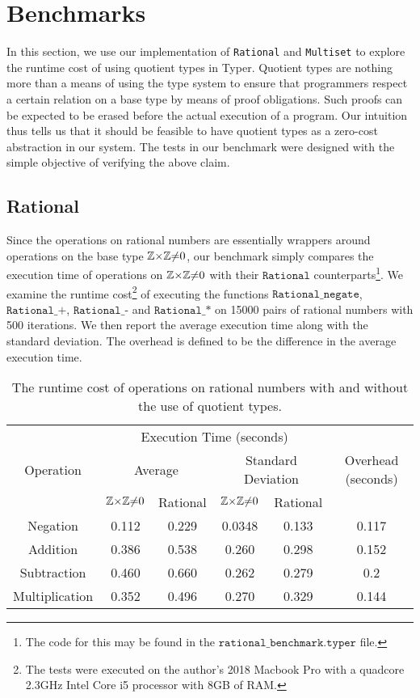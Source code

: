 \documentclass[12pt,twoside,maitrise]{dms}
\theoremstyle{definition}
\numberwithin{equation}{section}
\numberwithin{table}{chapter}
\numberwithin{figure}{chapter}
\newcommand\id[1] {\texttt{#1}}
\newcommand\fn[1] {\texttt{#1}}
\begin{document}
\section*{Benchmarks}\label{sec:quot-benchmark}

In this section, we use our implementation of \id{Rational} and \id{Multiset} to
explore the runtime cost of using quotient types in Typer. Quotient types are
nothing more than a means of using the type system to ensure that programmers
respect a certain relation on a base type by means of proof obligations. Such
proofs can be expected to be erased before the actual execution of a program.
Our intuition thus tells us that it should be feasible to have quotient types as
a zero-cost abstraction in our system. The tests in our benchmark were designed
with the simple objective of verifying the above claim.

\subsection*{Rational}

Since the operations on rational numbers are essentially wrappers around
operations on the base type $\mathbb{Z}{\times}\mathbb{Z}{\ne}0$, our benchmark simply compares the
execution time of operations on $\mathbb{Z}{\times}\mathbb{Z}{\ne}0$ with their $\fn{Rational}$
counterparts\footnote{The code for this may be found in the
$\fn{rational\_benchmark.typer}$ file.}. We examine the runtime
cost\footnote{The tests were executed on the author's 2018 Macbook Pro with a
quadcore 2.3GHz Intel Core i5 processor with 8GB of RAM.} of executing the
functions $\fn{Rational\_negate}$, $\fn{Rational\_+}$, $\fn{Rational\_-}$ and
$\fn{Rational\_*}$ on 15000 pairs of rational numbers with 500 iterations.
We then report the average execution time along with the standard deviation. The
overhead is defined to be the difference in the average execution time.


\begin{table}[]
\centering
\begin{tabular}{@{}cccccc@{}}
\toprule
\multirow{3}{*}{Operation} & \multicolumn{4}{c}{Execution Time (seconds)}                         & \multirow{3}{*}{Overhead (seconds)} \\ \cmidrule(lr){2-5}
                           & \multicolumn{2}{c}{Average} & \multicolumn{2}{c}{Standard Deviation} &                                     \\ \cmidrule(lr){2-5}
               & $\mathbb{Z}{\times}\mathbb{Z}{\ne}0$ & Rational & $\mathbb{Z}{\times}\mathbb{Z}{\ne}0$ & Rational &         \\ \midrule
Negation       & 0.112   & 0.229   & 0.0348 & 0.133  & 0.117  \\
Addition       & 0.386   & 0.538   & 0.260  & 0.298  & 0.152  \\
Subtraction    & 0.460   & 0.660   & 0.262  & 0.279  & 0.2  \\
Multiplication & 0.352   & 0.496   & 0.270  & 0.329  & 0.144 \\ \bottomrule
\end{tabular}
\caption{The runtime cost of operations on rational numbers with and without the
  use of quotient types.}\label{tab:rational-benchmark}
\end{table}
\end{document}
